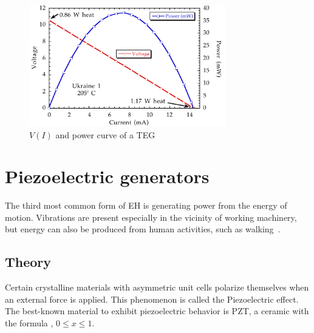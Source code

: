 \documentclass[a4paper,10pt]{article}
\begin{document}
\begin{figure}[h]
\centering
 \includegraphics[height=150pt]{./Slike/TEG-curve}
\caption{$V(I)$ and power curve of a \ac{TEG}~\cite{teg-curve}}
\label{fig:teg-curve}
\end{figure}

\section{Piezoelectric generators}

The third most common form of \ac{EH} is generating power from the energy of motion. Vibrations are present especially in the vicinity of working machinery, but energy can also be produced from human activities, such as walking~\cite{piezo-shoe-ieee}. 

\subsection{Theory}

Certain crystalline materials with asymmetric unit cells polarize themselves when an external force is applied. This phenomenon is called the Piezoelectric effect. The best-known material to exhibit piezoelectric behavior is \ac{PZT}, a ceramic with the formula , $0\leq x \leq 1$.
\end{document}
